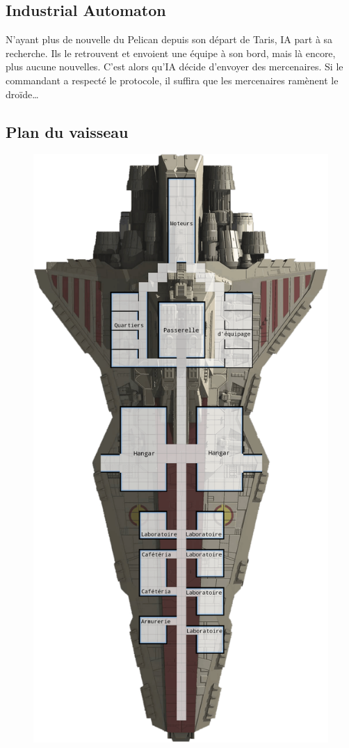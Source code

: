 \subsection{Industrial Automaton}
N’ayant plus de nouvelle du Pelican depuis son départ de Taris, IA part à sa recherche. Ils le retrouvent et envoient une équipe à son bord, mais là encore, plus aucune nouvelles. C’est alors qu’IA décide d’envoyer des mercenaires. Si le commandant a respecté le protocole, il suffira que les mercenaires ramènent le droïde\ldots

\onecolumn
\subsection{Plan du vaisseau}

\begin{figure}[!h]
	\centering
	\includegraphics[height=0.87\textheight]{_img/dos-au-muur/venator-plan.png}

\end{figure}
